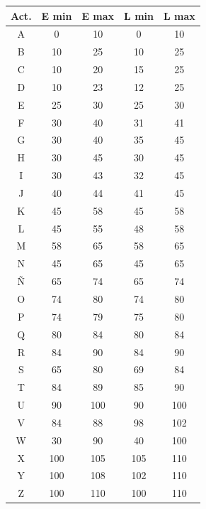 \documentclass[]{article}
\begin{document}
\begin{table}[ht]
\centering
\begin{tabular}{|c|c|c|c|c|}
\hline
Act. & E min & E max & L min & L max \\ \hline
A    & 0     & 10    & 0     & 10    \\ \hline
B    & 10    & 25    & 10    & 25    \\ \hline
C    & 10    & 20    & 15    & 25    \\ \hline
D    & 10    & 23    & 12    & 25    \\ \hline
E    & 25    & 30    & 25    & 30    \\ \hline
F    & 30    & 40    & 31    & 41    \\ \hline
G    & 30    & 40    & 35    & 45    \\ \hline
H    & 30    & 45    & 30    & 45    \\ \hline
I    & 30    & 43    & 32    & 45    \\ \hline
J    & 40    & 44    & 41    & 45    \\ \hline
K    & 45    & 58    & 45    & 58    \\ \hline
L    & 45    & 55    & 48    & 58    \\ \hline
M    & 58    & 65    & 58    & 65    \\ \hline
N    & 45    & 65    & 45    & 65    \\ \hline
Ñ    & 65    & 74    & 65    & 74    \\ \hline
O    & 74    & 80    & 74    & 80    \\ \hline
P    & 74    & 79    & 75    & 80    \\ \hline
Q    & 80    & 84    & 80    & 84    \\ \hline
R    & 84    & 90    & 84    & 90    \\ \hline
S    & 65    & 80    & 69    & 84    \\ \hline
T    & 84    & 89    & 85    & 90    \\ \hline
U    & 90    & 100   & 90    & 100   \\ \hline
V    & 84    & 88    & 98    & 102   \\ \hline
W    & 30    & 90    & 40    & 100   \\ \hline
X    & 100   & 105   & 105   & 110   \\ \hline
Y    & 100   & 108   & 102   & 110   \\ \hline
Z    & 100   & 110   & 100   & 110   \\ \hline
\end{tabular}
\end{table}
\end{document}

